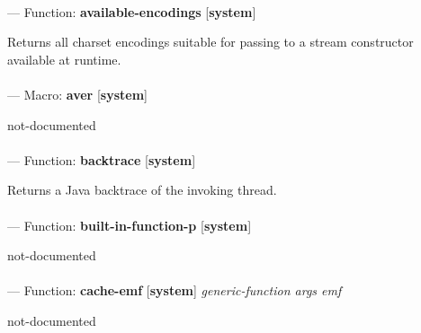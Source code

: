 \paragraph{}
\label{SYSTEM:AVAILABLE-ENCODINGS}
--- Function: \textbf{available-encodings} [\textbf{system}] \textit{}

\begin{adjustwidth}{5em}{5em}
Returns all charset encodings suitable for passing to a stream constructor available at runtime.
\end{adjustwidth}

\paragraph{}
\label{SYSTEM:AVER}
--- Macro: \textbf{aver} [\textbf{system}] \textit{}

\begin{adjustwidth}{5em}{5em}
not-documented
\end{adjustwidth}

\paragraph{}
\label{SYSTEM:BACKTRACE}
--- Function: \textbf{backtrace} [\textbf{system}] \textit{}

\begin{adjustwidth}{5em}{5em}
Returns a Java backtrace of the invoking thread.
\end{adjustwidth}

\paragraph{}
\label{SYSTEM:BUILT-IN-FUNCTION-P}
--- Function: \textbf{built-in-function-p} [\textbf{system}] \textit{}

\begin{adjustwidth}{5em}{5em}
not-documented
\end{adjustwidth}

\paragraph{}
\label{SYSTEM:CACHE-EMF}
--- Function: \textbf{cache-emf} [\textbf{system}] \textit{generic-function args emf}

\begin{adjustwidth}{5em}{5em}
not-documented
\end{adjustwidth}

